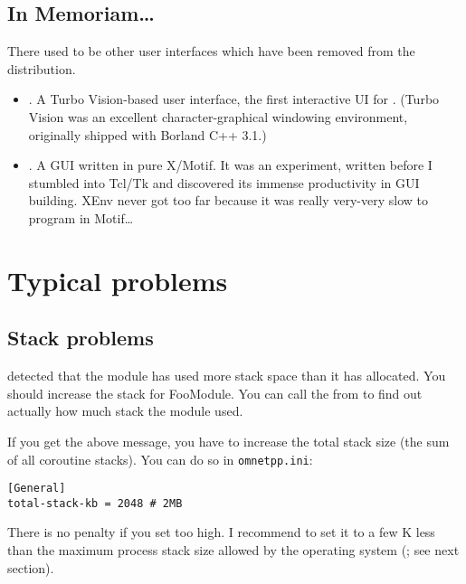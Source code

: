 \subsection{In Memoriam\dots }

There used to be other user interfaces which have been removed 
from the distribution.
\begin{itemize}
  \item{. A Turbo Vision-based user interface, the first
    interactive UI for {\opp}. (Turbo Vision was an excellent
    character-graphical windowing environment, originally shipped with
    Borland C++ 3.1.)}
  \item{. A GUI written in pure X/Motif. It was an
    experiment, written before I stumbled into Tcl/Tk and discovered
    its immense productivity in GUI building. XEnv never got too far
    because it was really very-very slow to program in Motif\dots}
\end{itemize}




\section{Typical problems}

\subsection{Stack problems}


{\opp} detected that the module has used more stack space than it has
allocated. You should increase the stack for FooModule. You can call
the  from  to find out actually
how much stack the module used.


If you get the above message, you have to increase the total stack
size (the sum of all coroutine stacks). You can do
so in \texttt{omnetpp.ini}:

\begin{Verbatim}
[General]
total-stack-kb = 2048 # 2MB
\end{Verbatim}


There is no penalty if you set  too high. I
recommend to set it to a few K less than the maximum process stack
size allowed by the operating system (; see
next section).



